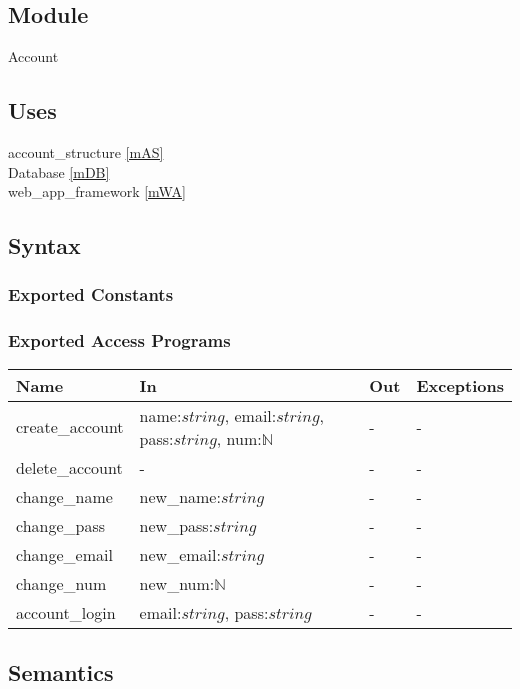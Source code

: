 \documentclass[12pt, titlepage]{article}
\begin{document}
\subsection{Module}

Account

\subsection{Uses}

account\_structure \ref{mAS} \\
Database \ref{mDB} \\
web\_app\_framework \ref{mWA}

\subsection{Syntax}

\subsubsection{Exported Constants}

\subsubsection{Exported Access Programs}

\begin{center}
\begin{tabular}{p{3cm} p{9cm} p{2cm} p{2cm}}
\hline
\textbf{Name} & \textbf{In} & \textbf{Out} & \textbf{Exceptions} \\
\hline
create\_account & name:$string$, email:$string$, pass:$string$, num:$\mathbb{N}$ & - & - \\
delete\_account & - & - & - \\
change\_name & new\_name:$string$ & - & - \\
change\_pass & new\_pass:$string$ & - & - \\
change\_email & new\_email:$string$ & - & - \\
change\_num & new\_num:$\mathbb{N}$ & - & - \\
account\_login & email:$string$, pass:$string$ & - & - \\
\hline
\end{tabular}
\end{center}

\subsection{Semantics}
\end{document}
